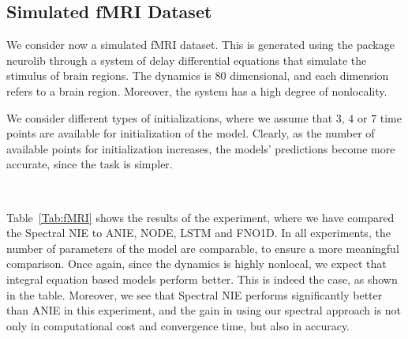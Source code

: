 \documentclass[11pt,fleqn]{amsart} %
\begin{document}
	
	\subsection{Simulated fMRI Dataset}
	
	We consider now a simulated fMRI dataset. This is generated using the package neurolib \cite{neurolib} through a system of delay differential equations that simulate the stimulus of brain regions. The dynamics is $80$ dimensional, and each dimension refers to a brain region. Moreover, the system has a high degree of nonlocality.
	
	We consider different types of initializations, where we assume that $3$, $4$ or $7$ time points are available for initialization of the model. Clearly, as the number of available points for initialization increases, the models' predictions become more accurate, since the task is simpler.
	
	\begin{table}[h!]
		\centering
		\caption{Experimental results for fMRI simulated dataset: all reported values refer to mean squared error. The models are initialized with varying amount of time points.}
		\label{Tab:fMRI}
	\end{table}\
	
	Table~\ref{Tab:fMRI} shows the results of the experiment, where we have compared the Spectral NIE to ANIE, NODE, LSTM and FNO1D. In all experiments, the number of parameters of the model are comparable, to ensure a more meaningful comparison. Once again, since the dynamics is highly nonlocal, we expect that integral equation based models perform better. This is indeed the case, as shown in the table. Moreover, we see that Spectral NIE performs significantly better than ANIE in this experiment, and the gain in using our spectral approach is not only in computational cost and convergence time, but also in accuracy.
	
\end{document}
